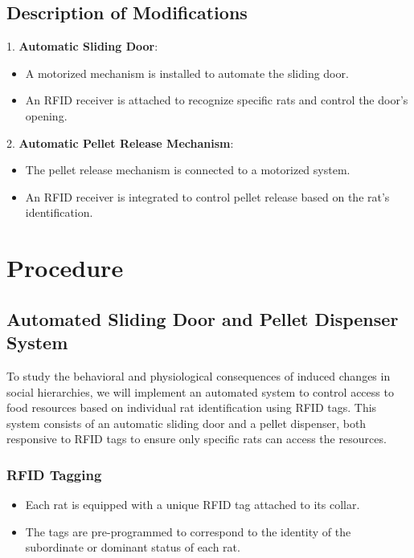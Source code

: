 \documentclass[english, a4paper, 11pt]{article}
\begin{document}
\subsection*{Description of Modifications}

1. \textbf{Automatic Sliding Door}:
\begin{itemize}
    \item A motorized mechanism is installed to automate the sliding door.
    \item An RFID receiver is attached to recognize specific rats and control the door's opening.
\end{itemize}

2. \textbf{Automatic Pellet Release Mechanism}:
\begin{itemize}
    \item The pellet release mechanism is connected to a motorized system.
    \item An RFID receiver is integrated to control pellet release based on the rat's identification.
\end{itemize}
\section*{Procedure}

\subsection*{Automated Sliding Door and Pellet Dispenser System}

To study the behavioral and physiological consequences of induced changes in social hierarchies, we will implement an automated system to control access to food resources based on individual rat identification using RFID tags\cite{habedankMouseWhereArt2020}. This system consists of an automatic sliding door and a pellet dispenser, both responsive to RFID tags to ensure only specific rats can access the resources.

\subsubsection*{RFID Tagging}
\begin{itemize}
    \item Each rat is equipped with a unique RFID tag attached to its collar.
    \item The tags are pre-programmed to correspond to the identity of the subordinate or dominant status of each rat.
\end{itemize}
\end{document}
